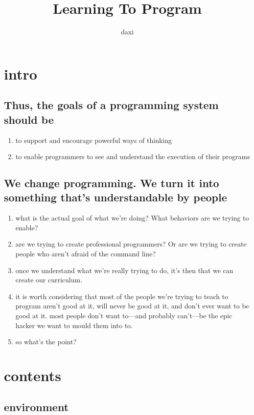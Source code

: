 \documentclass{article}
\title{Learning To Program}
\author{daxi}
\begin{document}
	\maketitle
	\tableofcontents
	\section{intro}
	\subsection{Thus, the goals of a programming system should be}
	\begin{enumerate}
		\item to support and encourage powerful ways of thinking
		\item to enable programmers to see and understand the execution of their programs
	\end{enumerate}
	\subsection{We change programming. We turn it into something that's understandable by people}
	\begin{enumerate}
		\item what is the actual goal of what we're doing? What behaviors are we trying to enable?
		\item are we trying to create professional programmers? Or are we trying to create people who aren't afraid of the command line?
		\item once we understand what we're really trying to do, it's then that we can create our curriculum.
		\item it is worth considering that most of the people we're trying to teach to program aren't good at it, will never be good at it, and don't ever want to be good at it. most people don't want to---and probably can't---be the epic hacker we want to mould them into to.
		\item so what's the point?
	\end{enumerate}
	\section{contents}
	\subsection{environment}
\end{document}
